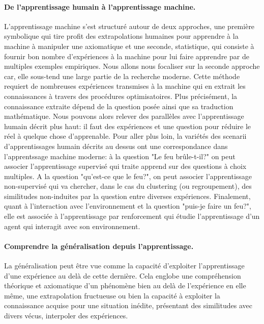 \paragraph{De l'apprentissage humain à l'apprentissage machine.}
    L'apprentissage machine s'est structuré autour de deux approches, une première symbolique qui tire profit des extrapolations humaines pour apprendre à la machine à manipuler une axiomatique et une seconde, statistique, qui consiste à fournir bon nombre d'expériences à la machine pour lui faire apprendre par de multiples exemples empiriques. Nous allons nous focaliser sur la seconde approche car, elle sous-tend une large partie de la recherche moderne.
    Cette méthode requiert de nombreuses expériences transmises à la machine qui en extrait les connaissances à travers des procédures optimisatoires. Plus précisément, la connaissance extraite dépend de la question posée ainsi que sa traduction mathématique. Nous pouvons alors relever des parallèles avec l'apprentissage humain décrit plus haut: il faut des expériences et une question pour réduire le réel à quelque chose d'apprenable. Pour aller plus loin, la variétés des scenarii d'apprentissages humain décrits au dessus ont une correspondance dans l'apprentssage machine moderne: à la question "Le feu brûle-t-il?" on peut associer l'apprentissage supervisé qui traite apprend sur des questions à choix multiples. A la question "qu'est-ce que le feu?", on peut associer l'apprentissage non-supervisé qui va chercher, dans le cas du clustering (ou regroupement), des similitudes non-induites par la question entre diverses expériences. Finalement, quant à l'interaction avec l'environnement et la question "puis-je faire un feu?", elle est associée à l'apprentissage par renforcement qui étudie l'apprentissage d'un agent qui interagit avec son environnement. 
    
\paragraph{Comprendre la généralisation depuis l'apprentissage.}
 La généralisation peut être vue comme la capacité d'exploiter l'apprentissage d'une expérience au delà de cette dernière. Cela englobe une compréhension théorique et axiomatique d'un phénomène bien au delà de l'expérience en elle même, \ie une extrapolation fructueuse ou bien la capacité à exploiter la connaissance acquise pour une situation inédite, présentant des similitudes avec divers vécus, \ie interpoler des expériences. 
    
